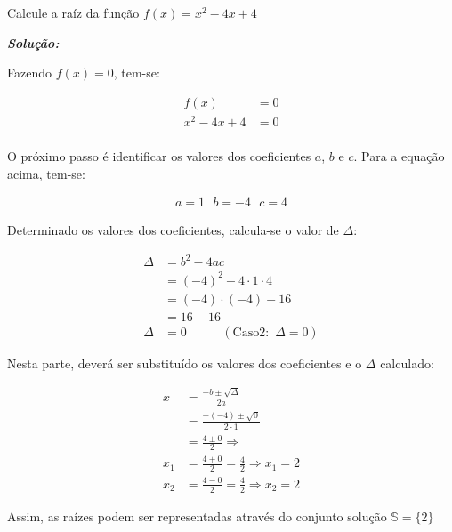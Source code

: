 \begin{example}\label{caso2}
	Calcule a raíz da função $f(x)=x^2-4x+4$
	
	\textit{\textbf{Solução:}}
	
	Fazendo $f(x)=0$, tem-se:
	\begin{ceqn}
		\begin{align*}
		f(x)&=0 \\
		x^2-4x+4&=0 \\
		\end{align*}
	\end{ceqn}
	
	O próximo passo é identificar os valores dos coeficientes $a$, $b$ e $c$. Para a equação acima, tem-se:
	
	\begin{ceqn}
		\begin{align*}
		a=1 \,\,\,\, b=-4 \,\,\,\, c=4
		\end{align*}
	\end{ceqn}
	
	Determinado os valores dos coeficientes, calcula-se o valor de $\Delta$:
	
	\begin{ceqn}
		\begin{align*}
		\Delta &= b^2-4ac \\
		&=(-4)^2-4 \cdot 1 \cdot 4 \\
		&= (-4)\cdot (-4)-16 \\
		&= 16-16 \\
		\Delta &=0 \,\,\,\,\,\,\,\,\,\,\,\,\,\,\,\,\, (\mathrm{Caso 2:}\,\, \Delta=0)
		\end{align*}
	\end{ceqn}
	
	Nesta parte, deverá ser substituído os valores dos coeficientes e o $\Delta$ calculado:
	
	\begin{ceqn}
		\begin{align*}
		x &= \frac{-b\pm \sqrt{\Delta}}{2a} \\
		&= \frac{-(-4)\pm\sqrt{0}}{2\cdot 1} \\
		&= \frac{4 \pm 0}{2} \Rightarrow \\
		x_1 &= \frac{4+0}{2}=\frac{4}{2} \Rightarrow x_1 = 2 \\
		x_2 &= \frac{4-0}{2}=\frac{4}{2} \Rightarrow x_2 = 2 
		\end{align*}
	\end{ceqn}
	
	Assim, as raízes podem ser representadas através do conjunto solução $\mathbb{S}=\{2\}$
	
\end{example}

